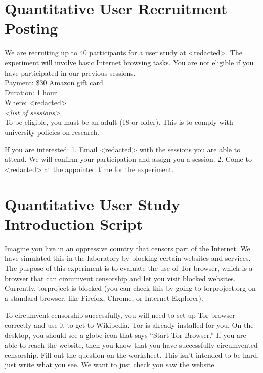 \documentclass[USenglish,oneside,twocolumn]{article}
\begin{document}
\section{Quantitative User Recruitment Posting}
\label{quantitative-recruitment}
We are recruiting up to 40 participants for a user study at <redacted>. %
The experiment will involve basic Internet browsing tasks. You are not eligible if you have participated in our previous sessions.\\

\indent Payment: \$30 Amazon gift card\\
\indent Duration: 1 hour \\
\indent Where: <redacted> \\ %

\textit{<list of sessions>}\\

To be eligible, you must be an adult (18 or older). This is to comply with university policies on research. 

If you are interested: 1. Email <redacted> %
with the sessions you are able to attend. We will confirm your participation and assign you a session. 
2. Come to <redacted> %
at the appointed time for the experiment.

\section{Quantitative User Study Introduction Script} 
\label{quantitative-script} 
Imagine you live in an oppressive country that censors part of the Internet. We have simulated this in the laboratory by blocking certain websites and services.  The purpose of this experiment is to evaluate the use of Tor browser, which is a browser that can circumvent censorship and let you visit blocked websites. Currently, torproject is blocked (you can check this by going to torproject.org on a standard browser, like Firefox, Chrome, or Internet Explorer). 

To circumvent censorship successfully, you will need to set up Tor browser correctly and use it to get to Wikipedia. Tor is already installed for you. On the desktop, you should see a globe icon that says ``Start Tor Browser.'' If you are able to reach the website, then you know that you have successfully circumvented censorship. Fill out the question on the worksheet. This isn't intended to be hard, just write what you see. We want to just check you saw the website. 
\end{document}
